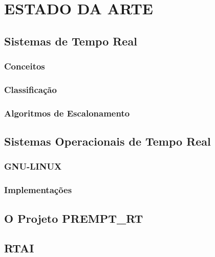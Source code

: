 \chapter{ESTADO DA ARTE}
\label{cap:estadoarte}

\section{Sistemas de Tempo Real}
\subsection{Conceitos}
\subsection{Classificação}
\subsection{Algoritmos de Escalonamento}

\section{Sistemas Operacionais de Tempo Real}
\subsection{GNU-LINUX}
\subsection{Implementações}

\section{O Projeto PREMPT\_RT}

\section{RTAI}